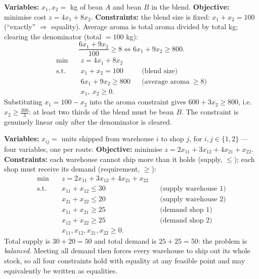 \begin{solutions}
  \item \textbf{Variables:} $x_1,x_2=$ kg of bean $A$ and bean $B$ in the
        blend.
        \textbf{Objective:} minimise cost $z=4x_1+8x_2$.
        \textbf{Constraints:} the blend size is fixed: $x_1+x_2=100$
        (``exactly'' $\Rightarrow$ equality). Average aroma is total aroma
        divided by total kg; clearing the denominator (total $=100$ kg):
        \[
          \frac{6x_1+9x_2}{100}\ge 8
          \iff 6x_1+9x_2\ge 800 .
        \]
        \[
          \begin{aligned}
            \min\quad & z=4x_1+8x_2\\
            \text{s.t.}\quad & x_1+x_2=100 &&\text{(blend size)}\\
            & 6x_1+9x_2\ge 800 &&\text{(average aroma}\ \ge 8)\\
            & x_1,\ x_2\ge 0 .
          \end{aligned}
        \]
        Substituting $x_1=100-x_2$ into the aroma constraint gives
        $600+3x_2\ge 800$, i.e.\ $x_2\ge \frac{200}{3}$: at least two
        thirds of the blend must be bean $B$. The constraint is genuinely
        linear only after the denominator is cleared.

  \item \textbf{Variables:} $x_{ij}=$ units shipped from warehouse $i$ to
        shop $j$, for $i,j\in\{1,2\}$ — four variables, one per route.
        \textbf{Objective:} minimise
        $z=2x_{11}+3x_{12}+4x_{21}+x_{22}$.
        \textbf{Constraints:} each warehouse cannot ship more than it
        holds (supply, $\le$); each shop must receive its demand
        (requirement, $\ge$):
        \[
          \begin{aligned}
            \min\quad & z=2x_{11}+3x_{12}+4x_{21}+x_{22}\\
            \text{s.t.}\quad & x_{11}+x_{12}\le 30
              &&\text{(supply warehouse 1)}\\
            & x_{21}+x_{22}\le 20 &&\text{(supply warehouse 2)}\\
            & x_{11}+x_{21}\ge 25 &&\text{(demand shop 1)}\\
            & x_{12}+x_{22}\ge 25 &&\text{(demand shop 2)}\\
            & x_{11},x_{12},x_{21},x_{22}\ge 0 .
          \end{aligned}
        \]
        Total supply is $30+20=50$ and total demand is $25+25=50$: the
        problem is \emph{balanced}. Meeting all demand then forces every
        warehouse to ship out its whole stock, so all four constraints
        hold with equality at any feasible point and may equivalently be
        written as equalities.


\end{solutions}
